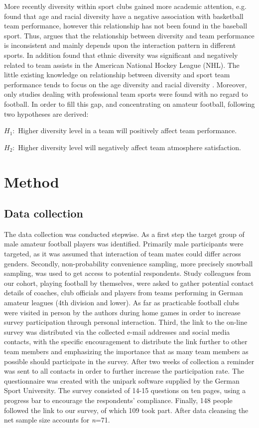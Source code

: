\documentclass[	
	12pt, %
	a4paper, %
]{scrartcl}\usepackage[]{graphicx}\usepackage[]{color}
\begin{document}
More recently diversity within sport clubs gained more academic attention, e.g.  found that age and racial diversity have a negative association with basketball team performance, however this relationship has not been found in the baseball sport. Thus,  argues that the relationship between diversity and team performance is inconsistent and mainly depends upon the interaction pattern in different sports. In addition  found that ethnic diversity was significant and negatively related to team assists in the American National Hockey League (NHL).
The little existing knowledge on relationship between diversity and sport team performance tends to focus on the age diversity and racial diversity \cite{Pelled1999, Jehn1999, Waltemyer2006, Timmerman2000}. Moreover, only studies dealing with professional team sports were found with no regard to football. In order to fill this gap, and concentrating on amateur football, following two hypotheses are derived:

$ H_{1}: $ Higher diversity level in a team will positively affect team performance.

$ H_{2}: $ Higher diversity level will negatively affect team atmosphere satisfaction.


\section{Method}
\label{sec:method}
\subsection{Data collection}
The data collection was conducted stepwise. As a first step the target group of male amateur football players was identified. Primarily male participants were targeted, as it was assumed that interaction of team mates could differ across genders. Secondly, non-probability convenience sampling, more precisely snowball sampling, was used to get access to potential respondents. Study colleagues from our cohort, playing football by themselves, were asked to gather potential contact details of coaches, club officials and players from teams performing in German amateur leagues (4th division and lower). As far as practicable football clubs were visited in person by the authors during home games in order to increase survey participation through personal interaction. Third, the link to the on-line survey was distributed via the collected e-mail addresses and social media contacts, with the specific encouragement to distribute the link further to other team members and emphasizing the importance that as many team members as possible should participate in the survey. After two weeks of collection a reminder was sent to all contacts in order to further increase the participation rate. The questionnaire was created with the unipark software supplied by the German Sport University. The survey consisted of 14-15 questions on ten pages, using a progress bar to encourage the respondents' compliance. Finally, 148 people followed the link to our survey, of which 109 took part. After data cleansing the net sample size accounts for \textit{n}=71. 
\end{document}
